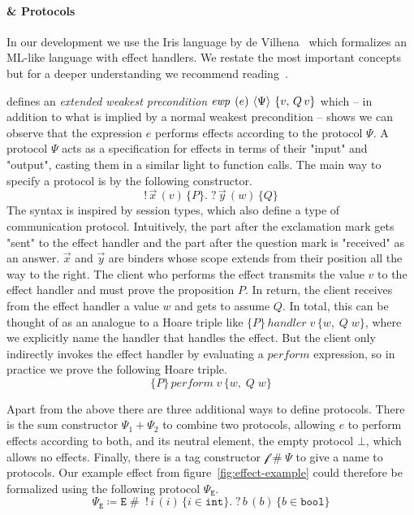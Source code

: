 \paragraph{\hazel{} \& Protocols}
In our development we use the Iris language \hazel{} by de Vilhena~\cite{de2021separation,de2022proof} which formalizes an ML-like language with effect handlers.
We restate the most important concepts but for a deeper understanding we recommend reading~\cite{de2021separation}.

\hazel{} defines an \emph{extended weakest precondition} \(\ewp{e}{\Psi}{v,\, Q\, v}\) which -- in addition to what is implied by a normal weakest precondition --
shows we can observe that the expression \(e\) performs effects according to the protocol \(\Psi\).
A protocol \(\Psi\) acts as a specification for effects in terms of their "input" and "output", casting them in a similar light to function calls.
The main way to specify a protocol is by the following constructor.
\[
  !\, \overrightarrow{x}\, (v)\, \{P\}.\; ?\, \overrightarrow{y}\, (w)\, \{Q\}
\]
The syntax is inspired by session types, which also define a type of communication protocol.
Intuitively, the part after the exclamation mark gets "sent" to the effect handler and the part after the question mark is "received" as an answer.
\(\overrightarrow{x}\) and \(\overrightarrow{y}\) are binders whose scope extends from their position all the way to the right.
The client who performs the effect transmits the value \(v\) to the effect handler and must prove the proposition \(P\).
In return, the client receives from the effect handler a value \(w\) and gets to assume \(Q\).
In total, this can be thought of as an analogue to a Hoare triple like \(\{P\}\, handler\; v\, \{w,\; Q\; w\}\), where we explicitly name the handler that handles the effect.
But the client only indirectly invokes the effect handler by evaluating a \(perform\) expression, so in practice we prove the following Hoare triple.
\[
  \{P\}\, perform\; v\, \{w,\; Q\; w\}
\]

Apart from the above there are three additional ways to define protocols.
There is the sum constructor \(\Psi_1 + \Psi_2\) to combine two protocols, allowing \(e\) to perform effects according to both, and its neutral element, the empty protocol \(\bot\),
which allows no effects.
Finally, there is a tag constructor \(\mathcal{f} \mathop{\#} \Psi\) to give a name to protocols.
Our example effect  from figure~\ref{fig:effect-example} could therefore be formalized using the following protocol \(\Psi_\mathtt{E}\).
\[
  \Psi_\mathtt{E} \coloneq \mathtt{E} \mathop{\#}\; !\, i\, (i)\, \{ i \in \mathtt{int} \}.\; ?\, b\, (b)\, \{ b \in \mathtt{bool} \}
\]

